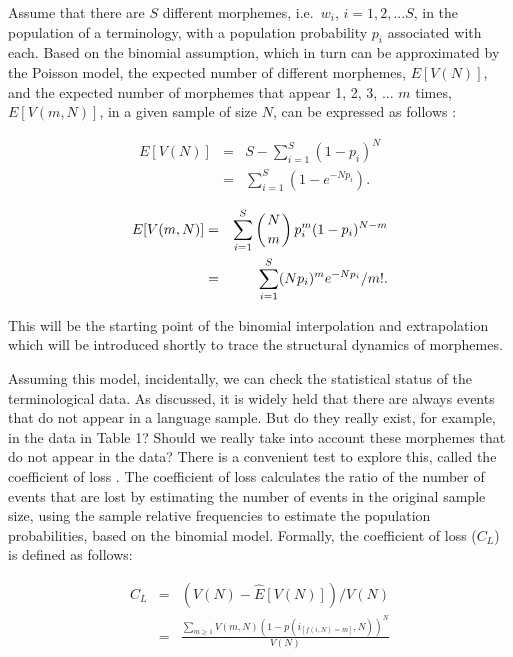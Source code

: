 Assume that there are $S$ different morphemes, i.e.\ $w_i$, $i = 1, 2, ... S$,
in the population of a terminology, with a population probability $p_i$
associated with each. Based on the binomial assumption, which in
turn can be approximated by the Poisson model, the expected number of different
morphemes, $E[V(N)]$, and the expected number of morphemes that appear
1, 2, 3, ... $m$ times, $E[V(m,N)]$, in a given sample of size $N$, can be
expressed as follows \cite{baayen01}:

\vspace*{-\baselineskip}
 
\begin{eqnarray}
E[V(N)] & = & S - \sum_{i=1}^S(1-p_i)^N \nonumber \\
	& = & \sum_{i=1}^S(1-e^{-Np_i}). \nonumber
\end{eqnarray}

\vspace*{-\baselineskip}
 
\begin{eqnarray}
E[V(m,N)] & = & \sum_{i=1}^S \left ( {N \atop m} \right ) p_i^m(1-p_i)^{N-m} \\
    & = &  \sum_{i=1}^S (Np_i)^me^{-Np_i}/m!. \nonumber
\end{eqnarray}

\noindent
This will be the starting point of the binomial interpolation and
extrapolation which will be introduced shortly to trace the structural
dynamics of morphemes.

Assuming this model, incidentally, we can check the statistical status of
the terminological data. As discussed, it is widely held that there
are always events that do not appear in a language sample. But do they really
exist, for example, in the data in Table 1? Should we really take into account these
morphemes that do not appear in the data? There is a convenient test to
explore this, called the coefficient of loss \cite{chita93}. The coefficient of
loss calculates the ratio of the number of events that are lost by estimating
the number of events in the original sample size, using the sample relative
frequencies to estimate the population probabilities, based on
the binomial model. Formally, the coefficient of loss ($C_L$) is defined
as follows:

\vspace*{-\baselineskip}
 
\begin{eqnarray}
C_L & = & (V(N) - \hat{E}[V(N)]) / V(N) \nonumber \\
    & = & \frac{\sum_{m \geq 1}V(m,N)(1 - p(i_{[f(i,N) = m]},N))^N}{V(N)}
    \nonumber
\end{eqnarray}

